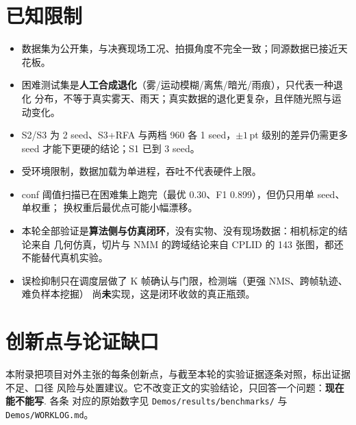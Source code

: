 \documentclass[UTF8,a4paper,11pt]{ctexart}
\begin{document}
\section{已知限制}

\begin{itemize}
  \item 数据集为公开集，与决赛现场工况、拍摄角度不完全一致；同源数据已接近天花板。
  \item 困难测试集是\textbf{人工合成退化}（雾/运动模糊/离焦/暗光/雨痕），只代表一种退化
        分布，不等于真实雾天、雨天；真实数据的退化更复杂，且伴随光照与运动变化。
  \item S2/S3 为 2 seed、S3+RFA 与两档 960 各 1 seed，$\pm1$\,pt 级别的差异仍需更多
        seed 才能下更硬的结论；S1 已到 3 seed。
  \item 受环境限制，数据加载为单进程，吞吐不代表硬件上限。
  \item conf 阈值扫描已在困难集上跑完（最优 0.30、F1 0.899），但仍只用单 seed、单权重；
        换权重后最优点可能小幅漂移。
  \item 本轮全部验证是\textbf{算法侧与仿真闭环}，没有实物、没有现场数据：相机标定的结论来自
        几何仿真，切片与 NMM 的跨域结论来自 CPLID 的 143 张图，都还不能替代真机实验。
  \item 误检抑制只在调度层做了 K 帧确认与门限，检测端（更强 NMS、跨帧轨迹、难负样本挖掘）
        尚\textbf{未}实现，这是闭环收敛的真正瓶颈。
\end{itemize}

\clearpage
\appendix
\section{创新点与论证缺口}

本附录把项目对外主张的每条创新点，与截至本轮的实验证据逐条对照，标出证据不足、口径
风险与处置建议。它不改变正文的实验结论，只回答一个问题：\textbf{现在能不能写}. 各条
对应的原始数字见 \texttt{Demos/results/benchmarks/} 与 \texttt{Demos/WORKLOG.md}。
\end{document}
